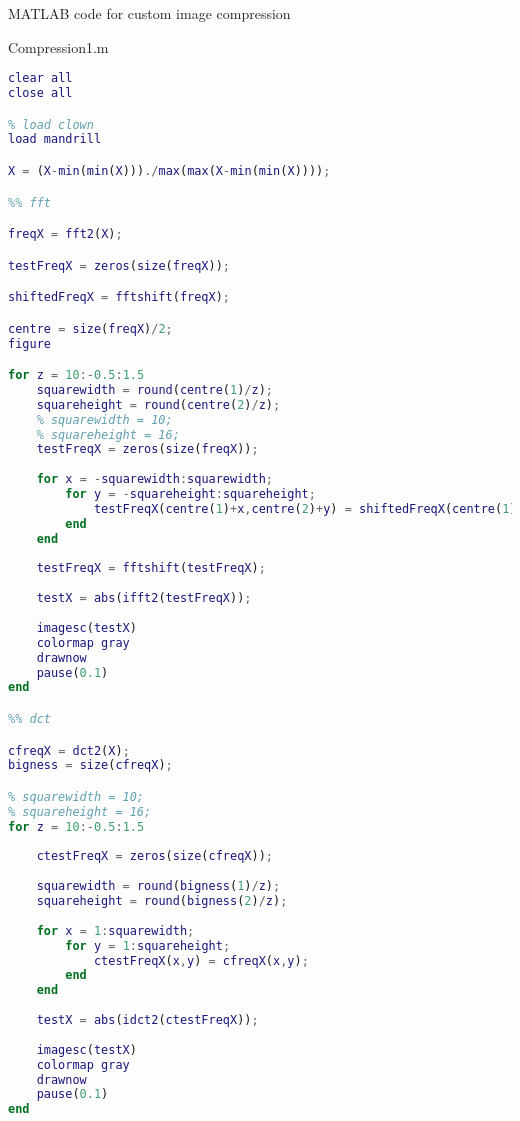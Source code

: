 MATLAB code for custom image compression

Compression1.m
\begin{lstlisting}[language=Matlab, label = lst:cust_comp1, caption = {Whole image, transform based compression code}]
clear all
close all

% load clown
load mandrill

X = (X-min(min(X)))./max(max(X-min(min(X))));

%% fft

freqX = fft2(X);

testFreqX = zeros(size(freqX));

shiftedFreqX = fftshift(freqX);

centre = size(freqX)/2;
figure

for z = 10:-0.5:1.5
    squarewidth = round(centre(1)/z);
    squareheight = round(centre(2)/z);
    % squarewidth = 10;
    % squareheight = 16;
    testFreqX = zeros(size(freqX));
    
    for x = -squarewidth:squarewidth;
        for y = -squareheight:squareheight;
            testFreqX(centre(1)+x,centre(2)+y) = shiftedFreqX(centre(1)+x,centre(2)+y);
        end
    end
    
    testFreqX = fftshift(testFreqX);
    
    testX = abs(ifft2(testFreqX));
    
    imagesc(testX)
    colormap gray
    drawnow
    pause(0.1)
end

%% dct

cfreqX = dct2(X);
bigness = size(cfreqX);

% squarewidth = 10;
% squareheight = 16;
for z = 10:-0.5:1.5
    
    ctestFreqX = zeros(size(cfreqX));
    
    squarewidth = round(bigness(1)/z);
    squareheight = round(bigness(2)/z);
    
    for x = 1:squarewidth;
        for y = 1:squareheight;
            ctestFreqX(x,y) = cfreqX(x,y);
        end
    end
    
    testX = abs(idct2(ctestFreqX));
    
    imagesc(testX)
    colormap gray
    drawnow
    pause(0.1)
end
\end{lstlisting}

